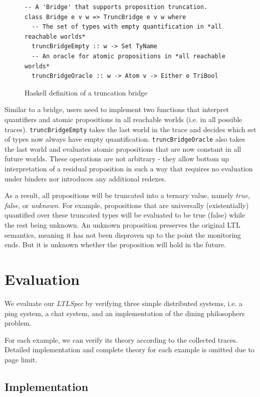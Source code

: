 \documentclass[format=acmsmall, nonacm=true, review=true, screen=true]{acmart}
\newcommand{\mycaption}[1]{\Description{#1}\caption{#1}}
\newcommand{\ltlspec}{\textit{LTLSpec}\xspace}
\begin{document}
\begin{figure}[h]
  {
    \fontsize{10}{12}\selectfont
    \begin{verbatim}
-- A 'Bridge' that supports proposition truncation.
class Bridge e v w => TruncBridge e v w where
  -- The set of types with empty quantification in *all reachable worlds*
  truncBridgeEmpty :: w -> Set TyName
  -- An oracle for atomic propositions in *all reachable worlds*
  truncBridgeOracle :: w -> Atom v -> Either e TriBool
\end{verbatim}
  }
  \mycaption{Haskell definition of a truncation bridge}
  \label{fig:truncation-sig}
\end{figure}

Similar to a bridge, users need to implement two functions that interpret quantifiers and atomic propositions in all reachable worlds (i.e. in all possible traces).
\texttt{truncBridgeEmpty} takes the last world in the trace and decides which set of types now always have empty quantification.
\texttt{truncBridgeOracle} also takes the last world and evaluates atomic propositions that are now constant in all future worlds.
These operations are not arbitrary - they allow bottom up interpretation of a residual proposition in such a way that requires no evaluation under binders nor introduces any additional redexes.

As a result, all propositions will be truncated into a ternary value, namely \textit{true}, \textit{false}, or \textit{unknown}.
For example, propositions that are universally (existentially) quantified over these truncated types will be evaluated to be true (false) while the rest being unknown.
An unknown proposition preserves the original LTL semantics, meaning it has not been disproven up to the point the monitoring ends. But it is unknown whether the proposition will hold in the future.

\section{Evaluation}

We evaluate our \ltlspec by verifying three simple distributed systems, i.e. a ping system, a chat system, and an implementation of the dining philosophers problem.

For each example, we can verify its theory according to the collected traces. Detailed implementation and complete theory for each example is omitted due to page limit.

\subsection{Implementation}
\end{document}
